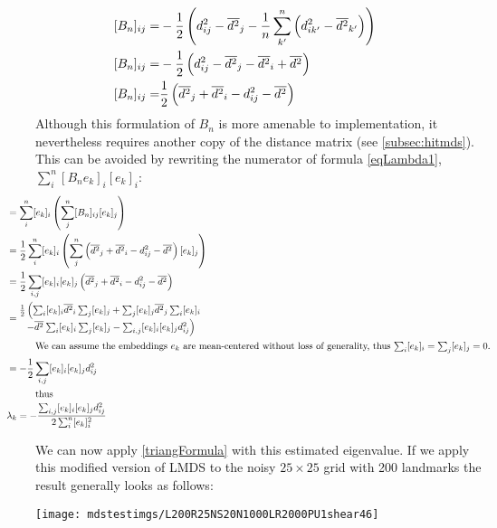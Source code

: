 \documentclass[10pt,fleqn,a4paper]{article}
\newcommand{\negmuchspace}{\negthinspace\negthinspace\negthinspace\negthinspace\negthinspace\negthinspace\negthinspace\negthinspace\negthinspace\negthinspace\negthinspace\negthinspace\negthinspace\negthinspace\negthinspace\negthinspace\negthinspace\negthinspace}
\newcommand{\ds}[1]{d^2_{#1}}
\newcommand{\dsa}[1]{\overline{d^2}_{#1}}
\begin{document}
\begin{twocolumn}
\begin{align}
\negmuchspace[B_n]_{ij}=& -\frac{1}{2} \left(\ds{ij}-\dsa{j} -\frac{1}{n}\sum_{k'}^n \left(\ds{ik'}-\dsa{k'}\right)  \right)\\
\negmuchspace[B_n]_{ij}=& -\frac{1}{2} \left(\ds{ij}-\dsa{j} -\dsa{i} + \dsa{} \right)\\
\negmuchspace[B_n]_{ij}=& \frac{1}{2} \left(\dsa{j}+\dsa{i} - \ds{ij}- \dsa{} \right)
\end{align}
%
Although this formulation of $B_n$ is more amenable to implementation, it nevertheless requires another copy of the distance matrix (see \ref{subsec:hitmds}).  This can be avoided by rewriting the numerator of formula \eqref{eqLambda1}, $\sum_i^n [B_n e_k]_i [e_k]_i$:
%
\begin{align}
\negmuchspace&= \sum_i^n [e_k]_i \left(\sum_j^n [B_n]_{ij} [e_k]_j \right) \\
\negmuchspace&= \frac{1}{2} \sum_i^n [e_k]_i \left(\sum_j^n \left(\dsa{j}+\dsa{i} - \ds{ij}- \dsa{} \right) [e_k]_j \right) \\
\negmuchspace&= \frac{1}{2} \sum_{i,j} [e_k]_i [e_k]_j \left(\dsa{j}+\dsa{i} - \ds{ij}- \dsa{} \right)   \\
\negmuchspace&=\begin{matrix} \frac{1}{2} \left(\sum_i [e_k]_i \dsa{i} \sum_j [e_k]_j + \sum_j [e_k]_j \dsa{j} \sum_i [e_k]_i \right. \\
  \left. - \dsa{} \sum_i [e_k]_i  \sum_j [e_k]_j    -  \sum_{i,j} [e_k]_i [e_k]_j \ds{ij} \right) \end{matrix}  \\
\intertext{We can assume the embeddings $e_k$ are mean-centered without loss of generality, thus $\sum_i [e_k]_i = \sum_j [e_k]_j = 0$.}
\negmuchspace&=-\frac{1}{2} \sum_{i,j} [e_k]_i [e_k]_j \ds{ij}  \\
\intertext{thus}
\negmuchspace&\lambda_k   =  - \frac{ \sum_{i,j} [e_k]_i [e_k]_j \ds{ij} }{2 \sum_i^n  [e_k]_i^2} \label{eqLambda2}  
\end{align}

We can now apply \eqref{triangFormula} with this estimated eigenvalue.  If we apply this modified version of LMDS to the noisy $25 \times 25$ grid with 200 landmarks the result generally looks as follows:
\vspace{-3mm}
\begin{center}\texttt{[image: mdstestimgs/L200R25NS20N1000LR2000PU1shear46]}\end{center}
\vspace{-5mm}


\end{twocolumn}
\end{document}
